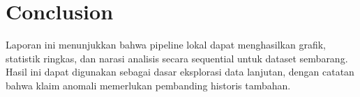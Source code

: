 \documentclass[11pt,a4paper]{article}
\begin{document}
\section{Conclusion}
Laporan ini menunjukkan bahwa pipeline lokal dapat menghasilkan grafik, statistik ringkas, dan narasi analisis secara sequential untuk dataset sembarang. Hasil ini dapat digunakan sebagai dasar eksplorasi data lanjutan, dengan catatan bahwa klaim anomali memerlukan pembanding historis tambahan.
\end{document}
